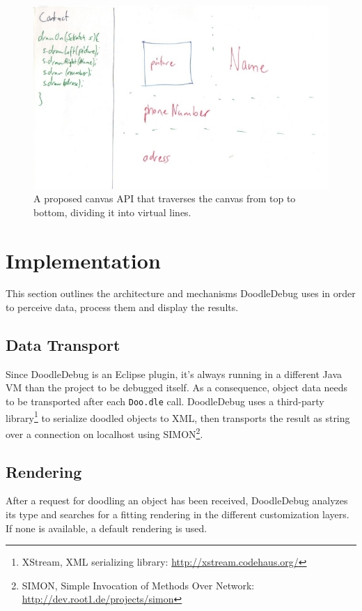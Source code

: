 \documentclass[english]{scrartcl}
\newcommand{\DD}{Dood\-le\-De\-bug\xspace}
\newcommand{\Doodle}{\texttt{Doo.\-dle}\xspace}
\begin{document}
\begin{figure}[h]
	\includegraphics[width=\linewidth]{img/sketches/026.jpg}
	\caption[Bad sketch example: Left-right pattern]{A proposed canvas API that traverses the canvas from top to bottom, dividing it into virtual lines.}
\end{figure}


\section{Implementation}
This section outlines the architecture and mechanisms \DD uses in order to perceive data, process them and display the results.

\subsection{Data Transport}
Since \DD is an Eclipse plugin, it's always running in a different Java VM than the project to be debugged itself.
As a consequence, object data needs to be transported after each \Doodle call.
\DD uses a third-party library\footnote{XStream, XML serializing library: \url{http://xstream.codehaus.org/}} to serialize doodled objects to XML, then transports the result as string over a connection on localhost using SIMON\footnote{SIMON, Simple Invocation of Methods Over Network: \url{http://dev.root1.de/projects/simon}}.

\subsection{Rendering}
After a request for doodling an object has been received, \DD analyzes its type and searches for a fitting rendering in the different customization layers.
If none is available, a default rendering is used.
\end{document}
